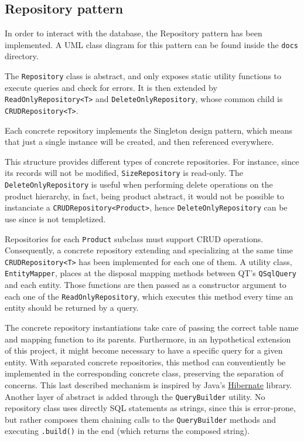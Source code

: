 \documentclass[10pt]{article}
\begin{document}
\subsection{Repository pattern}
\label{sec:repositoryPattern}
In order to interact with the database, the Repository pattern has been
implemented. A UML class diagram for this pattern can be found inside the
\texttt{docs} directory.

The \texttt{Repository} class is abstract, and only exposes static utility
functions to execute queries and check for errors. It is then extended by
\texttt{ReadOnlyRepository<T>} and \texttt{DeleteOnlyRepository}, whose common
child is \texttt{CRUDRepository<T>}.

Each concrete repository implements the Singleton design pattern, which means
that just a single instance will be created, and then referenced everywhere.

This structure provides different types of concrete repositories. For instance,
since its records will not be modified, \texttt{SizeRepository} is read-only.
The \texttt{DeleteOnlyRepository} is useful when performing delete operations
on the product hierarchy, in fact, being product abstract, it would not be
possible to instanciate a \texttt{CRUDRepository<Product>}, hence
\texttt{DeleteOnlyRepository} can be use since is not templetized.

Repositories for each \texttt{Product} subclass must support CRUD operations.
Consequently, a concrete repository extending and specializing at the same time
\texttt{CRUDRepository<T>} has been implemented for each one of them. A utility
class, \texttt{EntityMapper}, places at the disposal mapping methods between
QT's \texttt{QSqlQuery} and each entity. Those functions are then passed as a
constructor argument to each one of the \texttt{ReadOnlyRepository}, which
executes this method every time an entity should be returned by a query.

The concrete repository instantiations take care of passing the correct table
name and mapping function to its parents. Furthermore, in an hypothetical
extension of this project, it might become necessary to have a specific query
for a given entity. With separated concrete repositories, this method can
conventiently be implemented in the corresponding concrete class, preserving
the separation of concerns. This last described mechanism is inspired by Java's
\href{https://hibernate.org/}{Hibernate} library.\\\linebreak Another layer of
abstract is added through the \texttt{QueryBuilder} utility. No repository
class uses directly SQL statements as strings, since this is error-prone, but
rather composes them chaining calls to the \texttt{QueryBuilder} methods and
executing \texttt{.build()} in the end (which returns the composed string).
\end{document}

